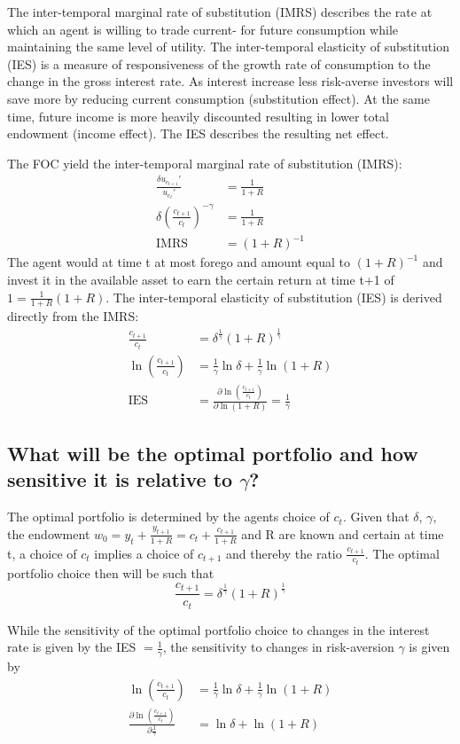 \documentclass[12pt]{article}
\begin{document}
	The inter-temporal marginal rate of substitution (IMRS) describes the rate at which an agent is willing to trade current- for future consumption while maintaining the same level of utility. The inter-temporal elasticity of substitution (IES) is a measure of responsiveness of the growth rate of consumption to the change in the gross interest rate. As interest increase less risk-averse investors will save more by reducing current consumption (substitution effect). At the same time, future income is more heavily discounted resulting in lower total endowment (income effect). The IES describes the resulting net effect.
	
	The FOC yield the inter-temporal marginal rate of substitution (IMRS):
	\begin{align*}
		\frac{\delta u_{c_{t+1}}'}{u_{c_t}'} &= \frac{1}{1+R}\\
		\delta \left( \frac{c_{t+1}}{c_t} \right)^{-\gamma} &= \frac{1}{1+R}\\
		\text{IMRS} &= (1+R)^{-1}
	\end{align*}
	The agent would at time t at most forego and amount equal to $(1+R)^{-1}$ and invest it in the available asset to earn the certain return at time t+1 of $1 = \frac{1}{1+R}(1+R)$. The inter-temporal elasticity of substitution (IES) is derived directly from the IMRS:
	\begin{align*}
		\frac{c_{t+1}}{c_t} &= \delta^{\frac{1}{\gamma}}(1+R)^{\frac{1}{\gamma}}\\
		\ln \left(\frac{c_{t+1}}{c_t}\right) &= \frac{1}{\gamma} \ln \delta + \frac{1}{\gamma} \ln (1+R)\\
		\text{IES} &= \frac{\partial \ln (\frac{c_{t+1}}{c_t})}{\partial\ln (1+R)} = \frac{1}{\gamma}
	\end{align*}
	
	\subsection{What will be the optimal portfolio and how sensitive it is relative to $\gamma$?}
	The optimal portfolio is determined by the agents choice of $c_t$. Given that $\delta$, $\gamma$, the endowment $w_0 = y_t + \frac{y_{t+1}}{1+R} = c_t + \frac{c_{t+1}}{1+R}$ and R are known and certain at time t, a choice of $c_t$ implies a choice of $c_{t+1}$ and thereby the ratio $\frac{c_{t+1}}{c_t}$. The optimal portfolio choice then will be such that $$\frac{c_{t+1}}{c_t} = \delta^{\frac{1}{\gamma}}(1+R)^{\frac{1}{\gamma}}$$
	
	While the sensitivity of the optimal portfolio choice to changes in the interest rate is given by the IES $= \frac{1}{\gamma}$, the sensitivity to changes in risk-aversion $\gamma$ is given by
	\begin{align*}
		\ln \left(\frac{c_{t+1}}{c_t}\right) &= \frac{1}{\gamma} \ln \delta + \frac{1}{\gamma} \ln (1+R)\\
		\frac{\partial \ln \left(\frac{c_{t+1}}{c_t}\right)}{\partial \frac{1}{\gamma}} &= \ln \delta + \ln (1+R)\\
	\end{align*}
	
\end{document}

